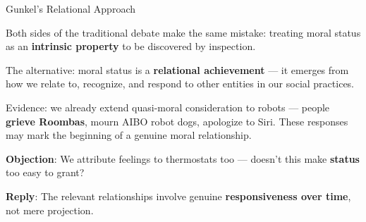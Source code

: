 \documentclass[aspectratio=169,11pt]{beamer}
\begin{document}
\begin{frame}[shrink=5]{Gunkel's Relational Approach}
\begin{conceptbox}
\small
Both sides of the traditional debate make the same mistake: treating moral status as an \textbf{intrinsic property} to be discovered by inspection.

\vspace{0.1cm}
The alternative: moral status is a \textbf{relational achievement} --- it emerges from how we relate to, recognize, and respond to other entities in our social practices.

\vspace{0.1cm}
Evidence: we already extend quasi-moral consideration to robots --- people \textbf{grieve Roombas}, mourn AIBO robot dogs, apologize to Siri. These responses may mark the beginning of a genuine moral relationship.
\end{conceptbox}

\vspace{0.1cm}
\textbf{Objection}: We attribute feelings to thermostats too --- doesn't this make \textbf{status} too easy to grant?

\vspace{0.05cm}
\textbf{Reply}: The relevant relationships involve genuine \textbf{responsiveness over time}, not mere projection.
\end{frame}
\end{document}
